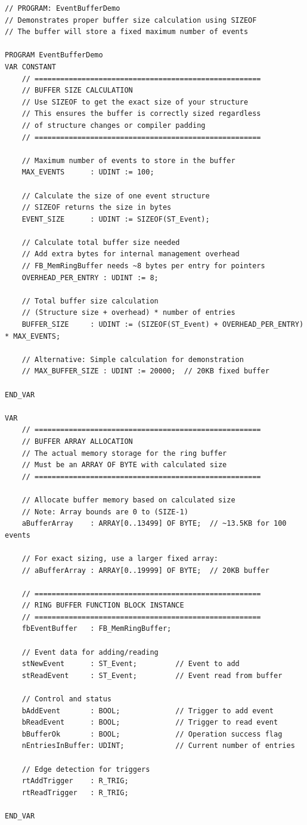 \documentclass[11pt,a4paper]{article}
\begin{document}
\begin{lstlisting}
// PROGRAM: EventBufferDemo
// Demonstrates proper buffer size calculation using SIZEOF
// The buffer will store a fixed maximum number of events

PROGRAM EventBufferDemo
VAR CONSTANT
    // =====================================================
    // BUFFER SIZE CALCULATION
    // Use SIZEOF to get the exact size of your structure
    // This ensures the buffer is correctly sized regardless
    // of structure changes or compiler padding
    // =====================================================
    
    // Maximum number of events to store in the buffer
    MAX_EVENTS      : UDINT := 100;
    
    // Calculate the size of one event structure
    // SIZEOF returns the size in bytes
    EVENT_SIZE      : UDINT := SIZEOF(ST_Event);
    
    // Calculate total buffer size needed
    // Add extra bytes for internal management overhead
    // FB_MemRingBuffer needs ~8 bytes per entry for pointers
    OVERHEAD_PER_ENTRY : UDINT := 8;
    
    // Total buffer size calculation
    // (Structure size + overhead) * number of entries
    BUFFER_SIZE     : UDINT := (SIZEOF(ST_Event) + OVERHEAD_PER_ENTRY) * MAX_EVENTS;
    
    // Alternative: Simple calculation for demonstration
    // MAX_BUFFER_SIZE : UDINT := 20000;  // 20KB fixed buffer
    
END_VAR

VAR
    // =====================================================
    // BUFFER ARRAY ALLOCATION
    // The actual memory storage for the ring buffer
    // Must be an ARRAY OF BYTE with calculated size
    // =====================================================
    
    // Allocate buffer memory based on calculated size
    // Note: Array bounds are 0 to (SIZE-1)
    aBufferArray    : ARRAY[0..13499] OF BYTE;  // ~13.5KB for 100 events
    
    // For exact sizing, use a larger fixed array:
    // aBufferArray : ARRAY[0..19999] OF BYTE;  // 20KB buffer
    
    // =====================================================
    // RING BUFFER FUNCTION BLOCK INSTANCE
    // =====================================================
    fbEventBuffer   : FB_MemRingBuffer;
    
    // Event data for adding/reading
    stNewEvent      : ST_Event;         // Event to add
    stReadEvent     : ST_Event;         // Event read from buffer
    
    // Control and status
    bAddEvent       : BOOL;             // Trigger to add event
    bReadEvent      : BOOL;             // Trigger to read event
    bBufferOk       : BOOL;             // Operation success flag
    nEntriesInBuffer: UDINT;            // Current number of entries
    
    // Edge detection for triggers
    rtAddTrigger    : R_TRIG;
    rtReadTrigger   : R_TRIG;
    
END_VAR
\end{lstlisting}
\end{document}
